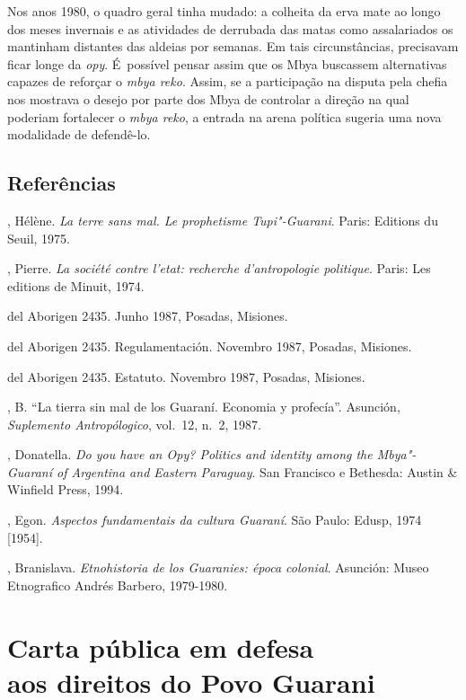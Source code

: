 Nos anos 1980, o quadro geral tinha mudado: a colheita da erva mate ao
longo dos meses invernais e as atividades de derrubada das matas como
assalariados os mantinham distantes das aldeias por semanas. Em tais
circunstâncias, precisavam ficar longe da \emph{opy}. É~possível pensar assim
que os Mbya buscassem alternativas capazes de reforçar o \emph{mbya reko}.
Assim, se a participação na disputa pela chefia nos mostrava o desejo
por parte dos Mbya de controlar a direção na qual poderiam fortalecer o
\emph{mbya reko}, a entrada na arena política sugeria uma nova modalidade de
defendê-lo. 

\section{Referências}

\begin{Parskip}
, Hélène. \emph{La terre sans mal. Le prophetisme Tupi"-Guarani}. Paris:
Editions du Seuil, 1975.

, Pierre. \emph{La société contre l’etat: recherche d’antropologie
politique}. Paris: Les editions de Minuit, 1974.

 del Aborigen 2435. Junho 1987, Posadas, Misiones.

 del Aborigen 2435. Regulamentación. Novembro 1987, Posadas,
Misiones.

 del Aborigen 2435. Estatuto. Novembro 1987, Posadas, Misiones.

, B. ``La tierra sin mal de los Guaraní. Economia y profecía''.
Asunción, \emph{Suplemento Antropólogico}, vol.~12, n.~2, 1987.

, Donatella. \emph{Do you have an \emph{Opy}? Politics and identity among the
Mbya"-Guaraní of Argentina and Eastern Paraguay}. San Francisco e
Bethesda: Austin \& Winfield Press, 1994.

, Egon. \emph{Aspectos fundamentais da cultura Guaraní}. São Paulo:
Edusp, 1974 [1954].

, Branislava. \emph{Etnohistoria de los Guaranies: época colonial}.
Asunción: Museo Etnografico Andrés Barbero, 1979-1980.
\end{Parskip}

\chapter*{Carta pública em defesa\\ aos direitos do Povo Guarani}

